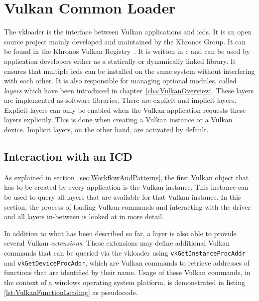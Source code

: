   \section{Vulkan Common Loader}
  \label{sec:VulkanLoader}
    The \gls{vkloader} is the interface between Vulkan applications and \glspl{icd}.
    It is an open source project mainly developed and maintained by the Khronos Group.
    It can be found in the Khronos Vulkan Registry~\cite{vulkanregistry}.
    It is written in \gls{c} and can be used by application developers either as a statically or dynamically linked library.
    It ensures that multiple \glspl{icd} can be installed on the same system without interfering with each other.
    It is also responsible for managing optional modules, called \textit{layers} which have been introduced in chapter~\ref{cha:VulkanOverview}.
    These layers are implemented as software libraries.
    There are explicit and implicit layers.
    Explicit layers can only be enabled when the Vulkan application requests these layers explicitly.
    This is done when creating a Vulkan instance or a Vulkan device.
    Implicit layers, on the other hand, are activated by default.

    \subsection{Interaction with an ICD}
      As explained in section~\ref{sec:WorkflowAndPatterns}, the first Vulkan object that has to be created by every application is the Vulkan instance.
      This instance can be used to query all layers that are available for that Vulkan instance.
      In this section, the process of loading Vulkan commands and interacting with the \gls{driver} and all layers in-between is looked at in more detail.

      In addition to what has been described so far, a layer is also able to provide several Vulkan \textit{extensions}.
      These extensions may define additional Vulkan commands that can be queried via the \gls{vkloader} using \lstinline{vkGetInstanceProcAddr} and \lstinline{vkGetDeviceProcAddr}, which are Vulkan commands to retrieve addresses of functions that are identified by their name.
      Usage of these Vulkan commands, in the context of a \gls{windows} operating system platform, is demonstrated in listing \ref{lst:VulkanFunctionLoading} as pseudocode.

